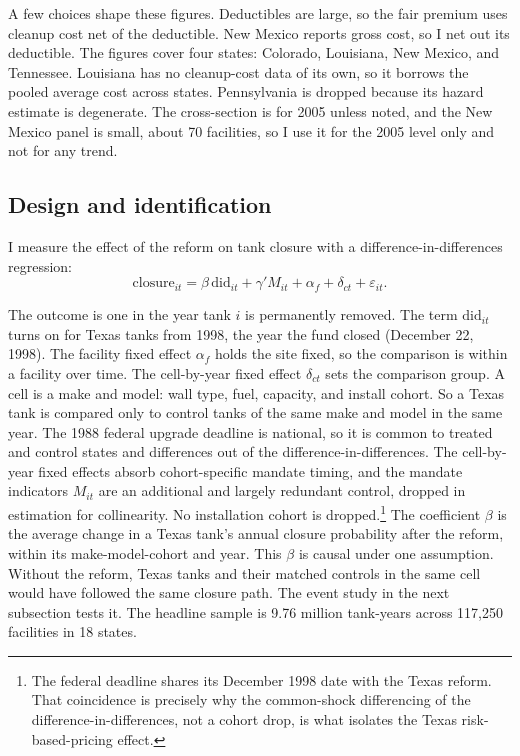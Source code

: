 \documentclass[
  12pt,
]{article}
\begin{document}
A few choices shape these figures. Deductibles are large, so the fair
premium uses cleanup cost net of the deductible. New Mexico reports
gross cost, so I net out its deductible. The figures cover four states:
Colorado, Louisiana, New Mexico, and Tennessee. Louisiana has no
cleanup-cost data of its own, so it borrows the pooled average cost
across states. Pennsylvania is dropped because its hazard estimate is
degenerate. The cross-section is for 2005 unless noted, and the New
Mexico panel is small, about 70 facilities, so I use it for the 2005
level only and not for any trend.

\subsection{Design and identification}\label{design-and-identification}

I measure the effect of the reform on tank closure with a
difference-in-differences regression: \[
\text{closure}_{it}=\beta\,\text{did}_{it}+\gamma'M_{it}+\alpha_f+\delta_{ct}+\varepsilon_{it}.
\]

The outcome is one in the year tank \(i\) is permanently removed. The
term \(\text{did}_{it}\) turns on for Texas tanks from 1998, the year
the fund closed (December 22, 1998). The facility fixed effect
\(\alpha_f\) holds the site fixed, so the comparison is within a
facility over time. The cell-by-year fixed effect \(\delta_{ct}\) sets
the comparison group. A cell is a make and model: wall type, fuel,
capacity, and install cohort. So a Texas tank is compared only to
control tanks of the same make and model in the same year. The 1988
federal upgrade deadline is national, so it is common to treated and
control states and differences out of the difference-in-differences. The
cell-by-year fixed effects absorb cohort-specific mandate timing, and
the mandate indicators \(M_{it}\) are an additional and largely
redundant control, dropped in estimation for collinearity. No
installation cohort is dropped.\footnote{The federal deadline shares its
  December 1998 date with the Texas reform. That coincidence is
  precisely why the common-shock differencing of the
  difference-in-differences, not a cohort drop, is what isolates the
  Texas risk-based-pricing effect.} The coefficient \(\beta\) is the
average change in a Texas tank's annual closure probability after the
reform, within its make-model-cohort and year. This \(\beta\) is causal
under one assumption. Without the reform, Texas tanks and their matched
controls in the same cell would have followed the same closure path. The
event study in the next subsection tests it. The headline sample is 9.76
million tank-years across 117,250 facilities in 18 states.
\end{document}
